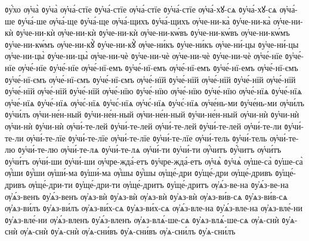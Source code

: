 {ᲂу҆́хо
ѹ҆ча̀
ᲂу҆ча̀
ѹ҆ча́-стїе
ᲂу҆ча́-стїе
ѹ҆ча́-стїе
ᲂу҆ча́-стїе
ѹ҆ча́-хꙋ-сѧ
ᲂу҆ча́-хꙋ-сѧ
ѹ҆ча́-ше
ᲂу҆ча́-ше
ѹ҆ча́-ще
ᲂу҆ча́-ще
ѹ҆ча́-щихъ
ᲂу҆ча́-щихъ
ѹ҆че-ни-ка̀
ᲂу҆че-ни-ка̀
ѹ҆че-ни-кѝ
ᲂу҆че-ни-кѝ
ѹ҆че-ни-кѝ
ᲂу҆че-ни-кѝ
ѹ҆че-ни-кѡ́въ
ᲂу҆че-ни-кѡ́въ
ѹ҆че-ни-кѡ́мъ
ᲂу҆че-ни-кѡ́мъ
ѹ҆че-ни-кꙋ̀
ᲂу҆че-ни-кꙋ̀
ѹ҆че-ни́къ
ᲂу҆че-ни́къ
ѹ҆че-ни́-цы
ᲂу҆че-ни́-цы
ѹ҆че-ни-цы̀
ᲂу҆че-ни-цы̀
ѹ҆че-ни-чѐ
ᲂу҆че-ни-чѐ
ѹ҆че-ни-чѐ
ᲂу҆че-ни-чѐ
ѹ҆че́-нїе
ᲂу҆че́-нїе
ѹ҆че́-нїе
ᲂу҆че́-нїе
ѹ҆че́-нї-емъ
ᲂу҆че́-нї-емъ
ѹ҆че́-нї-емъ
ᲂу҆че́-нї-емъ
ѹ҆че́-нї-ємъ
ᲂу҆че́-нї-ємъ
ѹ҆че́-нї-ємъ
ᲂу҆че́-нї-ємъ
ѹ҆че́-нїй
ᲂу҆че́-нїй
ѹ҆че́-нїй
ᲂу҆че́-нїй
ѹ҆че́-нїй
ᲂу҆че́-нїй
ѹ҆че́-нїй
ᲂу҆че́-нїй
ѹ҆че́-нїю
ᲂу҆че́-нїю
ѹ҆че́-нїю
ᲂу҆че́-нїю
ѹ҆че́-нїѧ
ᲂу҆че́-нїѧ
ѹ҆че́-нїѧ
ᲂу҆че́-нїѧ
ѹ҆чє́-нїѧ
ᲂу҆чє́-нїѧ
ѹ҆чє́-нїѧ
ᲂу҆чє́-нїѧ
ѹ҆че́нь-ми
ᲂу҆че́нь-ми
ѹ҆чи́лъ
ᲂу҆чи́лъ
ѹ҆чи-не́н-ный
ᲂу҆чи-не́н-ный
ѹ҆чи-не́н-ный
ᲂу҆чи-не́н-ный
ѹ҆чи-нѝ
ᲂу҆чи-нѝ
ѹ҆чи-нѝ
ᲂу҆чи-нѝ
ѹ҆чи́-те-лей
ᲂу҆чи́-те-лей
ѹ҆чи́-те-лей
ᲂу҆чи́-те-лей
ѹ҆чи́-те-ли
ᲂу҆чи́-те-ли
ѹ҆чи́-те-лїе
ᲂу҆чи́-те-лїе
ѹ҆чи́-те-лїе
ᲂу҆чи́-те-лїе
ѹ҆чи́-тель
ᲂу҆чи́-тель
ѹ҆чи́-те-лю
ᲂу҆чи́-те-лю
ѹ҆чи́-те-лѧ
ᲂу҆чи́-те-лѧ
ѹ҆чи́-ти
ᲂу҆чи́-ти
ѹ҆́читъ
ᲂу҆́читъ
ѹ҆чи́тъ
ᲂу҆чи́тъ
ѹ҆чи́-ши
ᲂу҆чи́-ши
ѹ҆чре-жда́-етъ
ᲂу҆чре-жда́-етъ
ѹ҆чѧ̀
ᲂу҆чѧ̀
ѹ҆ше-са̀
ᲂу҆ше-са̀
ѹ҆́ши
ᲂу҆́ши
ѹ҆ши́-ма
ᲂу҆ши́-ма
ѹ҆́шы
ᲂу҆́шы
ѹ҆ще́-дри
ᲂу҆ще́-дри
ѹ҆ще́-дривъ
ᲂу҆ще́-дривъ
ѹ҆ще́-дри-ти
ᲂу҆ще́-дри-ти
ѹ҆ще́-дритъ
ᲂу҆ще́-дритъ
ѹ҆ѧ́з-ве-на
ᲂу҆ѧ́з-ве-на
ѹ҆ѧ́з-венъ
ᲂу҆ѧ́з-венъ
ѹ҆ѧз-вѝ
ᲂу҆ѧз-вѝ
ѹ҆ѧз-вѝ
ᲂу҆ѧз-вѝ
ѹ҆ѧз-ви́в-сѧ
ᲂу҆ѧз-ви́в-сѧ
ѹ҆ѧз-ви́лъ
ᲂу҆ѧз-ви́лъ
ѹ҆ѧз-ви́х-сѧ
ᲂу҆ѧз-ви́х-сѧ
ѹ҆ѧ́з-вле-на
ᲂу҆ѧ́з-вле-на
ѹ҆ѧз-вле́-ни
ᲂу҆ѧз-вле́-ни
ѹ҆ѧ́з-вленъ
ᲂу҆ѧ́з-вленъ
ѹ҆ѧз-влѧ́-ше-сѧ
ᲂу҆ѧз-влѧ́-ше-сѧ
ѹ҆ѧ-снѝ
ᲂу҆ѧ-снѝ
ѹ҆ѧ-снѝ
ᲂу҆ѧ-снѝ
ѹ҆ѧ-сни́въ
ᲂу҆ѧ-сни́въ
ѹ҆ѧ-сни́лъ
ᲂу҆ѧ-сни́лъ
}
